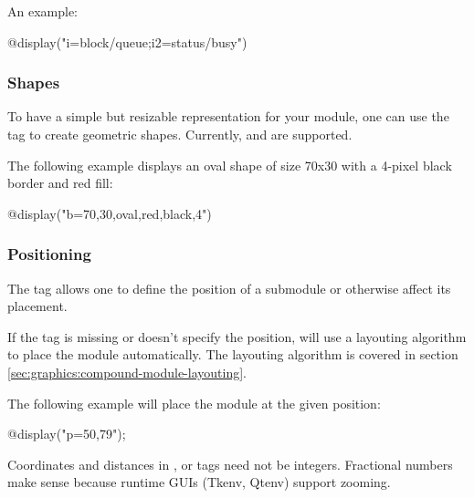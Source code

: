 An example:

\begin{ned}
@display("i=block/queue;i2=status/busy")
\end{ned}

\begin{center}
\end{center}

\subsubsection{Shapes}
\label{sec:graphics:submodule-shapes}

To have a simple but resizable representation for your module, one can use
the  tag to create geometric shapes. Currently,  and
 are supported.

The following example displays an oval shape of size 70x30 with a 4-pixel
black border and red fill:

\begin{ned}
@display("b=70,30,oval,red,black,4")
\end{ned}

\begin{center}
\end{center}

\subsubsection{Positioning}
\label{sec:graphics:submodule-positioning}

The  tag allows one to define the position of a submodule or
otherwise affect its placement.

\begin{note}
If the  tag is missing or doesn't specify the position, {\opp} will
use a layouting algorithm to place the module automatically. The layouting
algorithm is covered in section \ref{sec:graphics:compound-module-layouting}.
\end{note}

The following example will place the module at the given position:

\begin{ned}
@display("p=50,79");
\end{ned}

\begin{note}
Coordinates and distances in ,  or  tags need not
be integers. Fractional numbers make sense because runtime GUIs (Tkenv,
Qtenv) support zooming.
\end{note}

